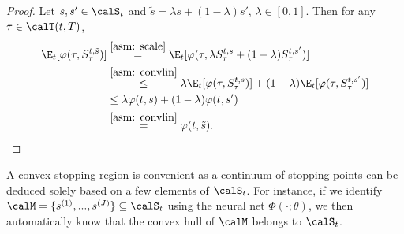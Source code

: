 \begin{proof}
Let $s,s'\in \calS_t$ and $\tilde{s}=\lambda s + (1-\lambda)s'$, $\lambda \in [0,1]$. Then for any $\tau \in \calT(t,T)$,
\begin{align*}
\E_t[\varphi(\tau,S^{t,\tilde{s}}_\tau)] &\overset{\ref{asm: scale}}{=} \E_t[\varphi(\tau,\lambda S^{t,s}_\tau + (1-\lambda) S^{t,s'}_\tau)]\\
    &\overset{\ref{asm: convlin}}{\leq} \lambda \E_t[\varphi(\tau, S^{t,s}_\tau)]
    +
    (1-\lambda)\E_t[\varphi(\tau, S^{t,s'}_\tau)]\\
    &\leq \lambda \varphi(t,s) + (1-\lambda) \varphi(t,s')\\
    &\overset{\ref{asm: convlin}}{=} \varphi(t,\tilde{s}).
\end{align*}
\end{proof}
A convex stopping region is convenient as a continuum of stopping points can be deduced solely based on a few elements of $\calS_t$. For instance, if we identify $\calM = \{s^{(1)},...,s^{(J)}\} \subseteq \calS_t$ using the neural net $\Phi(\cdot;\theta)$,  we then automatically know that the convex hull of $\calM$ belongs to $\calS_t$.

